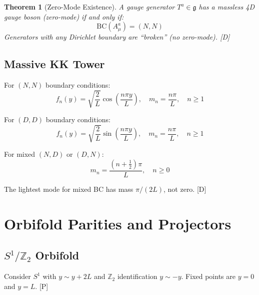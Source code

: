\documentclass[11pt,a4paper]{article}
\newtheorem{theorem}{Theorem}[section]
\newcommand{\tagD}{\textcolor{blue!70!black}{[D]}}
\newcommand{\tagP}{\textcolor{green!50!black}{[P]}}
\begin{document}
\begin{resultbox}
\begin{theorem}[Zero-Mode Existence]
\label{thm:survivor}
A gauge generator $T^a \in \mathfrak{g}$ has a massless 4D gauge boson
(zero-mode) if and only if:
\begin{equation}
\label{eq:survivor-rule}
\boxed{\text{BC}(A_\mu^a) = (N, N)}
\end{equation}
Generators with any Dirichlet boundary are ``broken'' (no zero-mode). \tagD
\end{theorem}
\end{resultbox}

\subsection{Massive KK Tower}

For $(N,N)$ boundary conditions:
\begin{equation}
\label{eq:kk-NN}
f_n(y) = \sqrt{\frac{2}{L}} \cos\left(\frac{n\pi y}{L}\right), \quad
m_n = \frac{n\pi}{L}, \quad n \geq 1
\end{equation}

For $(D,D)$ boundary conditions:
\begin{equation}
\label{eq:kk-DD}
f_n(y) = \sqrt{\frac{2}{L}} \sin\left(\frac{n\pi y}{L}\right), \quad
m_n = \frac{n\pi}{L}, \quad n \geq 1
\end{equation}

For mixed $(N,D)$ or $(D,N)$:
\begin{equation}
\label{eq:kk-mixed}
m_n = \frac{(n + \tfrac{1}{2})\pi}{L}, \quad n \geq 0
\end{equation}

The lightest mode for mixed BC has mass $\pi/(2L)$, not zero. \tagD

\section{Orbifold Parities and Projectors}

\subsection{$S^1/\mathbb{Z}_2$ Orbifold}

Consider $S^1$ with $y \sim y + 2L$ and $\mathbb{Z}_2$ identification $y \sim -y$.
Fixed points are $y = 0$ and $y = L$. \tagP
\end{document}
